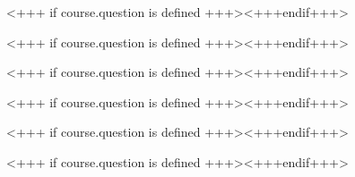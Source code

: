 \documentclass[english,xcolor=pdftex,dvipsnames,aspectratio=<+++ if course.aspectratio is defined +++><++course.aspectratio++><+++else+++>43<+++endif+++>]{beamer}
\begin{document}

<+++ if course.question is defined +++><+++endif+++> 


<+++ if course.question is defined +++><+++endif+++>


<+++ if course.question is defined +++><+++endif+++>
      

%

%

%


<+++ if course.question is defined +++><+++endif+++>


<+++ if course.question is defined +++><+++endif+++>


<+++ if course.question is defined +++><+++endif+++>



%
\end{document}
